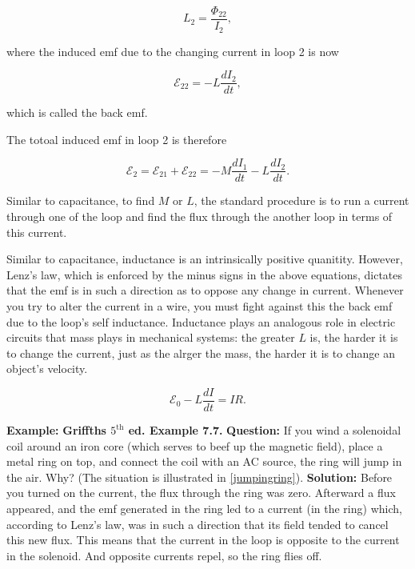 \documentclass[english,a4paper,12pt]{report}
\begin{document}
\begin{equation}
    L_2  = \frac{\Phi _{22}  }{I_2 }, 
\end{equation}

where the induced emf due to the changing current in loop 2 is now

\begin{equation}
    \mathcal{E}_{22} = - L\frac{dI_2 }{dt},  
\end{equation}

which is called the back emf.

The totoal induced emf in loop 2 is therefore

\begin{equation}
    \mathcal{E}_{2}   = \mathcal{E} _{21} + \mathcal{E}_{22} =  -M\frac{dI_1 }{dt}  - L \frac{dI_2 }{dt}.
\end{equation}





Similar to capacitance, to find \(M \text { or } L\), the standard procedure is to run a current through one of the loop and find the flux through the another loop in terms of this current.  

Similar to capacitance, inductance is an intrinsically positive quanitity. However, Lenz's law, which is enforced by the minus signs in the above equations, dictates that the emf is in such a direction as to oppose any change in current. Whenever you try to alter the current in a wire, you must fight against this the back emf due to the loop's self inductance. Inductance plays an analogous role in electric circuits that mass plays in mechanical systems: the greater \(L\) is, the harder it is to change the current, just as the alrger the mass, the harder it is to change an object's velocity.

\begin{equation}
    \mathcal{E}_{0} - L\frac{dI}{dt} = IR.  
\end{equation}

\begin{example_template}
    \textbf{Example:} \textbf{Griffths \(5^\text{th}\) ed. Example 7.7.} \newline \newline
    \textbf{Question:} If you wind a solenoidal coil around an iron core (which serves to beef up the magnetic field), place a metal ring on top, and connect the coil with an AC source, the ring will jump in the air. Why? (The situation is illustrated in \cref{jumpingring}). \newline \newline
    \textbf{Solution:} Before you turned on the current, the flux through the ring was zero. Afterward a flux appeared, and the emf generated in the ring led to a current (in the ring) which, according to Lenz’s law, was in such a direction that its field tended to cancel this new flux. This means that the current in the loop is opposite to the current in the solenoid. And opposite currents repel, so the ring flies off.
\end{example_template}
\end{document}
